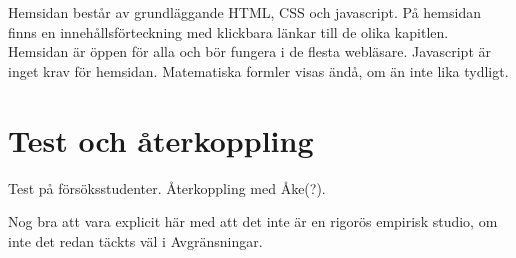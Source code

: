 \begin{binge}
Hemsidan består av grundläggande HTML, CSS och javascript. På hemsidan finns en innehållsförteckning med klickbara länkar till de olika kapitlen. Hemsidan är öppen för alla och bör fungera i de flesta webläsare. Javascript är inget krav för hemsidan. Matematiska formler visas ändå, om än inte lika tydligt.

  \section{Test och återkoppling}


  Test på försöksstudenter. Återkoppling med Åke(?).

  Nog bra att vara explicit här med att det inte är en rigorös empirisk
  studio, om inte det redan täckts väl i Avgränsningar.

\end{binge}
